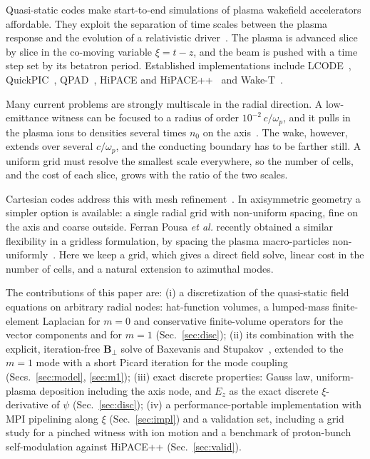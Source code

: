 \documentclass[aps,prab,reprint,floatfix,superscriptaddress,amsmath,amssymb]{revtex4-2}
\begin{document}
Quasi-static codes make start-to-end simulations of plasma wakefield accelerators affordable. They exploit the separation of time scales between the plasma response and the evolution of a relativistic driver~\cite{Mora1997}. The plasma is advanced slice by slice in the co-moving variable $\xi = t - z$, and the beam is pushed with a time step set by its betatron period. Established implementations include LCODE~\cite{Lotov2003,Sosedkin2016}, QuickPIC~\cite{Huang2006,An2013}, QPAD~\cite{Li2021}, HiPACE and HiPACE++~\cite{Mehrling2014,Diederichs2022} and Wake-T~\cite{FerranPousa2026}.

Many current problems are strongly multiscale in the radial direction. A low-emittance witness can be focused to a radius of order $10^{-2}\,c/\omega_p$, and it pulls in the plasma ions to densities several times $n_0$ on the axis~\cite{Rosenzweig2005,An2017}. The wake, however, extends over several $c/\omega_p$, and the conducting boundary has to be farther still. A uniform grid must resolve the smallest scale everywhere, so the number of cells, and the cost of each slice, grows with the ratio of the two scales.

Cartesian codes address this with mesh refinement~\cite{Diederichs2022}. In axisymmetric geometry a simpler option is available: a single radial grid with non-uniform spacing, fine on the axis and coarse outside. Ferran Pousa \textit{et al.} recently obtained a similar flexibility in a gridless formulation, by spacing the plasma macro-particles non-uniformly~\cite{FerranPousa2026}. Here we keep a grid, which gives a direct field solve, linear cost in the number of cells, and a natural extension to azimuthal modes.

The contributions of this paper are:
(i) a discretization of the quasi-static field equations on arbitrary radial nodes: hat-function volumes, a lumped-mass finite-element Laplacian for $m=0$ and conservative finite-volume operators for the vector components and for $m=1$ (Sec.~\ref{sec:disc});
(ii) its combination with the explicit, iteration-free $\bm{B}_\perp$ solve of Baxevanis and Stupakov~\cite{Baxevanis2018}, extended to the $m=1$ mode with a short Picard iteration for the mode coupling (Secs.~\ref{sec:model}, \ref{sec:m1});
(iii) exact discrete properties: Gauss law, uniform-plasma deposition including the axis node, and $E_z$ as the exact discrete $\xi$-derivative of $\psi$ (Sec.~\ref{sec:disc});
(iv) a performance-portable implementation with MPI pipelining along $\xi$ (Sec.~\ref{sec:impl}) and a validation set, including a grid study for a pinched witness with ion motion and a benchmark of proton-bunch self-modulation against HiPACE++ (Sec.~\ref{sec:valid}).
\end{document}
